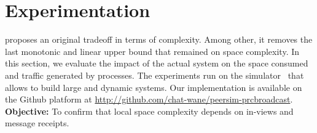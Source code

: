 
\section{Experimentation}
\label{sec:experimentation}

\RPCBROADCAST proposes an original tradeoff in terms of complexity. Among other,
it removes the last monotonic and linear upper bound that remained on space
complexity. In this section, we evaluate the impact of the actual system on the
space consumed and traffic generated by processes. The experiments run on the
\PEERSIM simulator~\cite{montresor2009peersim} that allows to build large and
dynamic systems. Our implementation is available on the Github platform at
\url{http://github.com/chat-wane/peersim-prcbroadcast}. \\


%   

\noindent \textbf{Objective:} To confirm that local space complexity
depends on in-views and message receipts.

